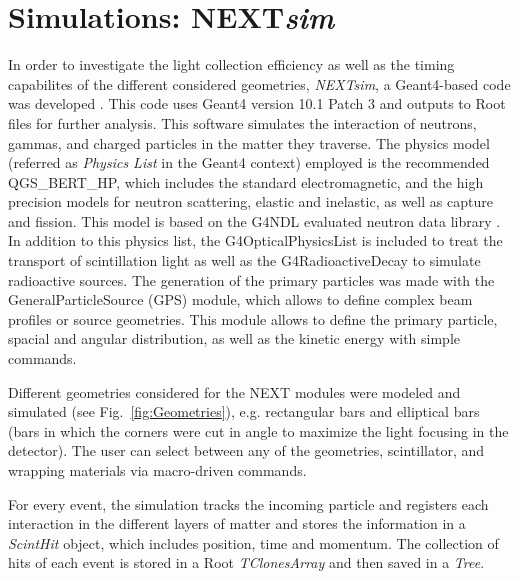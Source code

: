
\section{Simulations: NEXT\emph{sim}}
\begin{comment}
\begin{figure*}[htp]
 \centering
  \texttt{[image: Figures/Geometries.eps]}
  \caption{Visualization of a 1 Mev neutron event in NEXT\emph{sim} for two geometries considered for a NEXT layer. Green lines correspond to optical photons produced in the sctintillation.}
  \label{fig:Geometries}
\end{figure*} 
\end{comment}

In order to investigate the light collection efficiency as well as the timing capabilites of the different considered geometries, \emph{NEXTsim}, a {\sc Geant4}-based code was developed \cite{AGOSTINELLI2003250,ALLISON2016186}. This code uses  {\sc Geant4} version 10.1 Patch 3 and outputs to {\sc Root} files for further analysis.
This software simulates the interaction of neutrons, gammas, and charged particles in the matter they traverse. The  physics model (referred as \emph{Physics List} in the {\sc Geant4} context) employed is the recommended QGS\_BERT\_HP, which includes the standard electromagnetic, and the high precision models for neutron scattering, elastic and inelastic, as well as capture and fission.  This model is based on the G4NDL evaluated neutron data library \cite{Apostolakis2009}. In addition to this physics list, the G4OpticalPhysicsList is included to treat the transport of scintillation light as well as the G4RadioactiveDecay to simulate radioactive sources. The generation of the primary particles  was made with the GeneralParticleSource (GPS) module, which allows to define complex beam profiles or source geometries. This module allows to define the primary particle,  spacial and angular distribution, as well as the kinetic energy with simple commands.
 
 Different geometries considered for the NEXT modules were modeled and simulated (see  Fig.~\ref{fig:Geometries}), e.g. rectangular bars and elliptical bars (bars in which the corners were cut in angle to maximize the light focusing in the detector). The user can select between any of the geometries, scintillator, and wrapping materials via macro-driven commands.

For every event, the simulation tracks the incoming particle and registers each interaction in the different layers of matter and stores the information in a \emph{ScintHit} object, which includes position, time and momentum. The collection of hits of each event is stored in a  {\sc Root} \emph{TClonesArray} and then saved in a \emph{Tree}.

